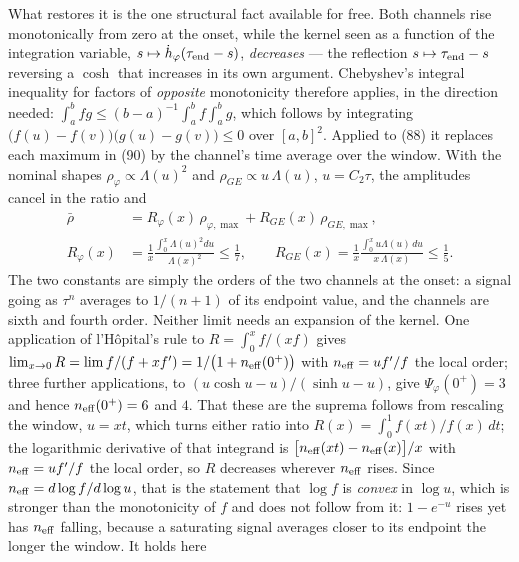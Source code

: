 \documentclass[10pt]{article}
\begin{document}
What restores it is the one structural fact available for free. Both
channels rise monotonically from zero at the onset, while the kernel
seen as a function of the integration variable,
$s\mapsto\dot h_\varphi(\tau_{\rm end}-s)$, \emph{decreases} --- the
reflection $s\mapsto\tau_{\rm end}-s$ reversing a $\cosh$ that
increases in its own argument. Chebyshev's integral inequality for
factors of \emph{opposite} monotonicity therefore applies, in the
direction needed:
$\int_a^b fg \le (b-a)^{-1}\!\int_a^b f\int_a^b g$, which follows by
integrating $\bigl(f(u)-f(v)\bigr)\bigl(g(u)-g(v)\bigr)\le0$ over
$[a,b]^2$. Applied to (88) it replaces each maximum in (90) by the
channel's time average over the window. With the nominal shapes
$\rho_\varphi\propto\Lambda(u)^2$ and $\rho_{GE}\propto u\,\Lambda(u)$,
$u = C_2\tau$, the amplitudes cancel in the ratio and
\begin{equation}
\begin{aligned}
  \bar\rho &= R_\varphi(x)\,\rho_{\varphi,\max}
            + R_{GE}(x)\,\rho_{GE,\max}, \\[2pt]
  R_\varphi(x) &= \frac{1}{x}\frac{\int_0^x\Lambda(u)^2du}{\Lambda(x)^2}
   \le \tfrac17,
  \qquad
  R_{GE}(x) = \frac{1}{x}\frac{\int_0^x u\Lambda(u)\,du}{x\,\Lambda(x)}
   \le \tfrac15 .
\end{aligned}
  \tag{95}
\end{equation}
The two constants are simply the orders of the two channels at the
onset: a signal going as $\tau^n$ averages to $1/(n{+}1)$ of its
endpoint value, and the channels are sixth and fourth order. Neither
limit needs an expansion of the kernel. One application of l'H\^opital's
rule to $R = \int_0^x\!f/(xf)$ gives $\lim_{x\to0}R =
\lim f/(f + xf') = 1/\bigl(1 + n_{\rm eff}(0^+)\bigr)$ with
$n_{\rm eff} = uf'/f$ the local order; three further applications, to
$(u\cosh u - u)/(\sinh u - u)$, give $\Psi_\varphi(0^+) = 3$ and hence
$n_{\rm eff}(0^+) = 6$ and $4$. That
these are the suprema follows from rescaling the window, $u = xt$,
which turns either ratio into $R(x) = \int_0^1 f(xt)/f(x)\,dt$; the
logarithmic derivative of that integrand is
$\bigl[n_{\rm eff}(xt) - n_{\rm eff}(x)\bigr]/x$ with
$n_{\rm eff} = u f'/f$ the local order, so $R$ decreases wherever
$n_{\rm eff}$ rises. Since $n_{\rm eff} = d\log f/d\log u$, that is the
statement that $\log f$ is \emph{convex} in $\log u$, which is stronger
than the monotonicity of $f$ and does not follow from it: $1-e^{-u}$
rises yet has $n_{\rm eff}$ falling, because a saturating signal
averages closer to its endpoint the longer the window. It holds here
\end{document}
